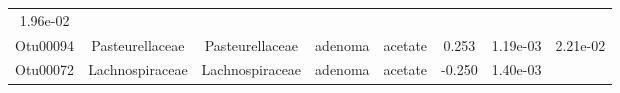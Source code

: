 \documentclass[11pt,]{article}
\begin{document}
\begin{longtable}[]{@{}cccccccc@{}}
\begin{minipage}[t]{0.08\columnwidth}
1.96e-02\strut
\end{minipage}\tabularnewline
\begin{minipage}[t]{0.08\columnwidth}\centering\strut
Otu00094\strut
\end{minipage} & \begin{minipage}[t]{0.15\columnwidth}\centering\strut
Pasteurellaceae\strut
\end{minipage} & \begin{minipage}[t]{0.15\columnwidth}\centering\strut
Pasteurellaceae\strut
\end{minipage} & \begin{minipage}[t]{0.08\columnwidth}\centering\strut
adenoma\strut
\end{minipage} & \begin{minipage}[t]{0.09\columnwidth}\centering\strut
acetate\strut
\end{minipage} & \begin{minipage}[t]{0.07\columnwidth}\centering\strut
0.253\strut
\end{minipage} & \begin{minipage}[t]{0.08\columnwidth}\centering\strut
1.19e-03\strut
\end{minipage} & \begin{minipage}[t]{0.08\columnwidth}\centering\strut
2.21e-02\strut
\end{minipage}\tabularnewline
\begin{minipage}[t]{0.08\columnwidth}\centering\strut
Otu00072\strut
\end{minipage} & \begin{minipage}[t]{0.15\columnwidth}\centering\strut
Lachnospiraceae\strut
\end{minipage} & \begin{minipage}[t]{0.15\columnwidth}\centering\strut
Lachnospiraceae\strut
\end{minipage} & \begin{minipage}[t]{0.08\columnwidth}\centering\strut
adenoma\strut
\end{minipage} & \begin{minipage}[t]{0.09\columnwidth}\centering\strut
acetate\strut
\end{minipage} & \begin{minipage}[t]{0.07\columnwidth}\centering\strut
-0.250\strut
\end{minipage} & \begin{minipage}[t]{0.08\columnwidth}\centering\strut
1.40e-03\strut
\end{minipage} & \begin{minipage}[t]{0.08\columnwidth}\centering\strut

\end{minipage}
\end{longtable}
\end{document}
